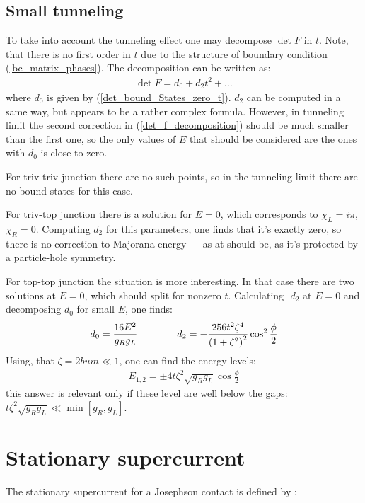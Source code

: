 \subsection{Small tunneling}
To take into account the tunneling effect one may decompose $ \det F $ in $ t $. Note, that there is no first order in $ t $ due to the structure of boundary condition (\ref{bc_matrix_phases}). The decomposition can be written as:
\begin{gather}
\label{det_f_decomposition}
	\det F
	=
	d_0
	+
	d_2t^2
	+
	\dots
\end{gather}
where $ d_0 $ is given by (\ref{det_bound_States_zero_t}). $ d_2 $ can be computed in a same way, but appears to be  a rather complex formula.  However, in tunneling limit the second correction in (\ref{det_f_decomposition}) should be much smaller than the first one, so the only values of $ E $ that should be considered are the ones with $ d_0 $ is close to zero.

For triv-triv junction there are no such points, so in the tunneling limit there are no bound states for this case.

For triv-top junction there is a solution for $ E=0 $, which corresponds to $ \chi_L=i \pi $, $ \chi_R=0 $. Computing $ d_2 $ for this parameters, one finds that it's exactly zero, so there is no correction to Majorana energy --- as at should be, as it's protected by a particle-hole symmetry.

For top-top junction the situation is more interesting. In that case there are two solutions at $ E=0 $, which should split for nonzero $ t $. Calculating $  $ $ d_2 $ at $ E=0 $ and decomposing $ d_0 $ for small $ E $, one finds:
\begin{gather}
d_0=\frac{16E^2}{g_Rg_L}
\qquad\qquad
	d_2 = -\frac{256t^2\zeta^4}{\left(1+\zeta^2\right)^2}\cos^2\frac{\phi}{2}
\end{gather}
Using, that $ \zeta=2bum\ll1 $, one can find the energy levels:
\begin{gather}
	E_{1,2}
	=
	\pm
	4t\zeta^2\sqrt{g_Rg_L}\cos\frac{\phi}{2}
\end{gather}
this answer is relevant only if these level are well below the gaps: $ t\zeta^2\sqrt{g_Rg_L}\ll\min\left[g_R,g_L\right] $.
\section{Stationary supercurrent }

\label{sec:stationary_supercurrent}
The stationary supercurrent for a Josephson contact is defined by \cite{Beenakker_three_universal}:

